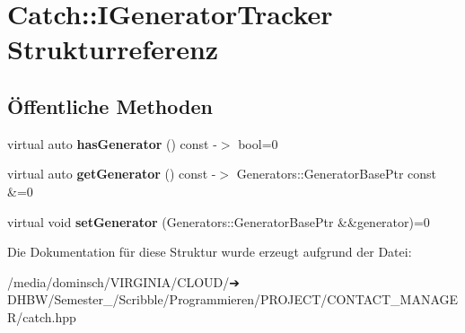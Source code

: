 \hypertarget{structCatch_1_1IGeneratorTracker}{}\section{Catch\+:\+:I\+Generator\+Tracker Strukturreferenz}
\label{structCatch_1_1IGeneratorTracker}
\subsection*{Öffentliche Methoden}
\begin{DoxyCompactItemize}
\item 
\mbox{\label{structCatch_1_1IGeneratorTracker_ae88084f9af27c8b9a5d5775b9c148498}} 
virtual auto {\bfseries has\+Generator} () const -\/$>$ bool=0
\item 
\mbox{\label{structCatch_1_1IGeneratorTracker_a23be942fc51672598bfa02c678c3078a}} 
virtual auto {\bfseries get\+Generator} () const -\/$>$ Generators\+::\+Generator\+Base\+Ptr const \&=0
\item 
\mbox{\label{structCatch_1_1IGeneratorTracker_a9945eff42219edc5a7071eebd8b0419e}} 
virtual void {\bfseries set\+Generator} (Generators\+::\+Generator\+Base\+Ptr \&\&generator)=0
\end{DoxyCompactItemize}


Die Dokumentation für diese Struktur wurde erzeugt aufgrund der Datei\+:\begin{DoxyCompactItemize}
\item 
/media/dominsch/\+V\+I\+R\+G\+I\+N\+I\+A/\+C\+L\+O\+U\+D/➔ D\+H\+B\+W/\+Semester\+\_/\+Scribble/\+Programmieren/\+P\+R\+O\+J\+E\+C\+T/\+C\+O\+N\+T\+A\+C\+T\+\_\+\+M\+A\+N\+A\+G\+E\+R/catch.\+hpp\end{DoxyCompactItemize}
